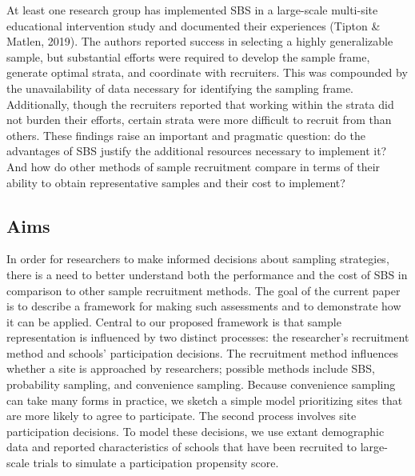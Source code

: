 \documentclass[
  man,floatsintext]{apa6}
\begin{document}
At least one research group has implemented SBS in a large-scale multi-site educational intervention study and documented their experiences (Tipton \& Matlen, 2019). The authors reported success in selecting a highly generalizable sample, but substantial efforts were required to develop the sample frame, generate optimal strata, and coordinate with recruiters.
This was compounded by the unavailability of data necessary for identifying the sampling frame.
Additionally, though the recruiters reported that working within the strata did not burden their efforts, certain strata were more difficult to recruit from than others.
These findings raise an important and pragmatic question: do the advantages of SBS justify the additional resources necessary to implement it?
And how do other methods of sample recruitment compare in terms of their ability to obtain representative samples and their cost to implement?

\hypertarget{aims}{%
\subsection*{Aims}\label{aims}}

In order for researchers to make informed decisions about sampling strategies, there is a need to better understand both the performance and the cost of SBS in comparison to other sample recruitment methods.
The goal of the current paper is to describe a framework for making such assessments and to demonstrate how it can be applied.
Central to our proposed framework is that sample representation is influenced by two distinct processes: the researcher's recruitment method and schools' participation decisions.
The recruitment method influences whether a site is approached by researchers; possible methods include SBS, probability sampling, and convenience sampling.
Because convenience sampling can take many forms in practice, we sketch a simple model prioritizing sites that are more likely to agree to participate.
The second process involves site participation decisions.
To model these decisions, we use extant demographic data and reported characteristics of schools that have been recruited to large-scale trials to simulate a participation propensity score.
\end{document}
